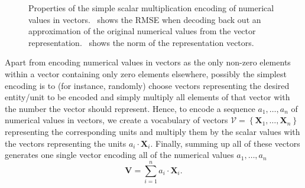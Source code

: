 \begin{figure}[t]
    \centering
    \caption{Properties of the simple scalar multiplication encoding of numerical values in vectors.~\protect{} shows the \ac{RMSE} when decoding back out an approximation of the original numerical values from the vector representation.~\protect{} shows the norm of the representation vectors.}
    \label{fig:scalar_multiplication_encoding}
\end{figure}
Apart from encoding numerical values in vectors as the only non-zero elements within a vector containing only zero elements elsewhere, possibly the simplest encoding is to (for instance, randomly) choose vectors representing the desired entity/unit to be encoded and simply multiply all elements of that vector with the number the vector should represent.
Hence, to encode a sequence $a_{1}, \ldots, a_{n}$ of numerical values in vectors, we create a vocabulary of vectors $\mathcal{V}=\left\{ \mathbf{X}_{1}, \ldots, \mathbf{X}_{n} \right\}$ representing the corresponding units and multiply them by the scalar values with the vectors representing the units $a_{i}\cdot \mathbf{X}_{i}$.
Finally, summing up all of these vectors generates one single vector encoding all of the numerical values $a_{1}, \ldots, a_{n}$ 
\begin{equation}
\label{eq:scalar_mult_encoding}
\mathbf{V} = \sum\limits_{i=1}^{n} a_{i}\cdot \mathbf{X}_{i}. 
\end{equation}

